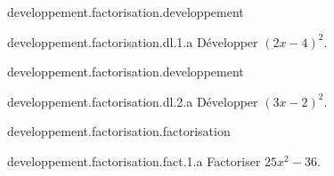 \begin{qcm}{developpement.factorisation.developpement}
  \begin{question}{developpement.factorisation.dl.1.a}
    Développer \((2x-4)^2\).
    \vspace{-1.5ex}
    \begin{multicols}{2}
      \begin{reponses}
      \end{reponses}
      \setcounter{unbalance}{1}
    \end{multicols}
  \end{question}
\end{qcm}

\begin{qcm}{developpement.factorisation.developpement}
  \begin{question}{developpement.factorisation.dl.2.a}
    Développer \((3x-2)^2\).
    \vspace{-1.5ex}
    \begin{multicols}{2}
      \begin{reponses}
      \end{reponses}
      \setcounter{unbalance}{1}
    \end{multicols}
  \end{question}
\end{qcm}




\begin{qcm}{developpement.factorisation.factorisation}
  \begin{question}{developpement.factorisation.fact.1.a}
    Factoriser \(25x^2-36\).
    \vspace{-1.5ex}
    \begin{multicols}{2}
      \begin{reponses}
      \end{reponses}
    \end{multicols}
  \end{question}
\end{qcm}


